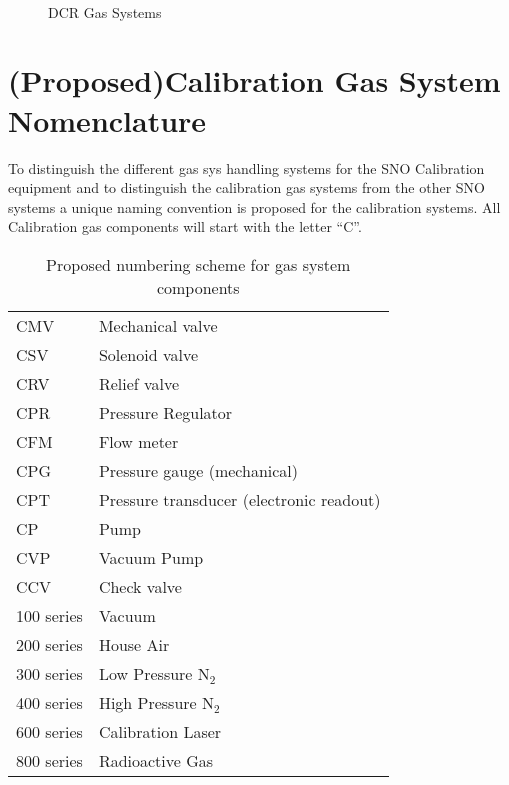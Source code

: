  
\begin{figure}[htb]
\begin{center}
\leavevmode
\epsfxsize=7in
~\\
\caption[DCR Gas Systems]
        {DCR Gas Systems
        }
\end{center}
\end{figure}


\section{(Proposed)Calibration Gas System Nomenclature}

  To distinguish the different gas sys handling systems for
the SNO Calibration equipment and to distinguish the calibration
gas systems from the other SNO systems a unique naming convention
is proposed for the calibration systems.  All Calibration 
gas components will start with the letter ``C''.


\begin{table}
\begin{center}
\begin{tabular}{|ll|}
\hline
  CMV  & Mechanical valve \\
  CSV  & Solenoid valve \\
  CRV  & Relief valve \\
  CPR  & Pressure Regulator \\
  CFM  & Flow meter \\
  CPG  & Pressure gauge (mechanical) \\
  CPT  & Pressure transducer (electronic readout) \\
  CP   & Pump\\
  CVP  & Vacuum Pump\\
  CCV  & Check valve\\
\hline
  100 series & Vacuum \\
  200 series & House Air \\
  300 series & Low Pressure N$_2$ \\
  400 series & High Pressure N$_2$ \\
  600 series & Calibration Laser \\
  800 series & Radioactive Gas \\
\hline
\end{tabular}
\caption[Proposed numbering scheme for gas system components]
  {Proposed numbering scheme for gas system components
  }
\end{center}
\end{table}


